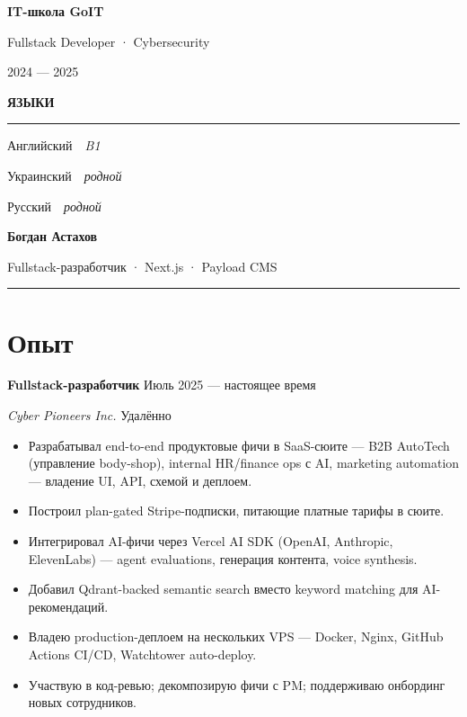 \documentclass[11pt,a4paper]{article}
\newcommand{\sidebarwidth}{5.8cm}
\newcommand{\sbsection}[1]{%
  \vspace{12pt}\par%
  {\color{accentLite}\normalsize\bfseries\MakeUppercase{#1}}\par%
  \vspace{2pt}%
  {\color{accent!60}\rule{\linewidth}{0.4pt}}\par%
  \vspace{4pt}%
}
\begin{document}
\begin{minipage}[t]{\sidebarwidth}
\begin{minipage}[t]{\dimexpr\sidebarwidth-1.4cm\relax}
{\bfseries IT-школа GoIT}\par
Fullstack Developer · Cybersecurity\par
{\color{accentLite}2024 — 2025}

\sbsection{Языки}
Английский\ \ {\color{sidebardim}\itshape B1}\par\vspace{4pt}
Украинский\ \ {\color{sidebardim}\itshape родной}\par\vspace{4pt}
Русский\ \ {\color{sidebardim}\itshape родной}

\end{minipage}
\end{minipage}%
%
\begin{minipage}[t]{\dimexpr\paperwidth-\sidebarwidth\relax}
\vspace*{1.1cm}\hspace{0.6cm}%
\begin{minipage}[t]{\dimexpr\paperwidth-\sidebarwidth-1.8cm\relax}

{\Huge\bfseries\color{darkgray}Богдан Астахов}\par
\vspace{3pt}
{\large\color{midgray}Fullstack-разработчик · Next.js · Payload CMS}\par
\vspace{6pt}
{\color{accent}\rule{\linewidth}{1.2pt}}

\section*{Опыт}

{\bfseries Fullstack-разработчик} \hfill {\color{midgray}\small Июль 2025 — настоящее время}\par
{\itshape Cyber Pioneers Inc.} \hfill {\color{midgray}\small Удалённо}
\begin{itemize}
  \item Разрабатывал end-to-end продуктовые фичи в SaaS-сюите —
        B2B AutoTech (управление body-shop), internal HR/finance ops
        с AI, marketing automation — владение UI, API, схемой и
        деплоем.
  \item Построил plan-gated Stripe-подписки, питающие платные тарифы
        в сюите.
  \item Интегрировал AI-фичи через Vercel AI SDK (OpenAI, Anthropic,
        ElevenLabs) — agent evaluations, генерация контента,
        voice synthesis.
  \item Добавил Qdrant-backed semantic search вместо keyword matching
        для AI-рекомендаций.
  \item Владею production-деплоем на нескольких VPS — Docker, Nginx,
        GitHub Actions CI/CD, Watchtower auto-deploy.
  \item Участвую в код-ревью; декомпозирую фичи с PM; поддерживаю
        онбординг новых сотрудников.
\end{itemize}


\end{minipage}
\end{minipage}
\end{document}
